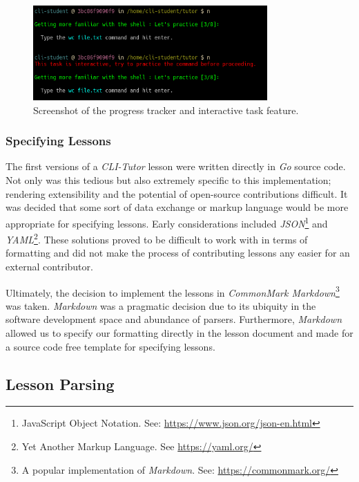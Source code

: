 \begin{figure}[htbp]
	\centering
	\includegraphics[width=0.8\textwidth]{img/tracker}
	\caption{Screenshot of the progress tracker and interactive task feature.}
	\label{fig:tracker}
\end{figure}
\clearpage

\subsubsection{Specifying Lessons}

The first versions of a \textit{CLI-Tutor} lesson were written directly in
\textit{Go} source code. Not only was this tedious but also extremely specific
to this implementation; rendering extensibility and the potential of open-source contributions
difficult. It was decided that some sort of data exchange or markup language
would be more appropriate for specifying lessons. Early considerations included
\textit{JSON}\footnote{JavaScript Object Notation. See:
\url{https://www.json.org/json-en.html}} and \textit{YAML}\footnote{Yet Another
Markup Language. See \url{https://yaml.org/}}. These solutions proved to be
difficult to work with in terms of formatting and did not make the process of
contributing lessons any easier for an external contributor.

Ultimately, the decision to implement the lessons in \textit{CommonMark
Markdown}\footnote{A popular implementation of \textit{Markdown}. See:
\url{https://commonmark.org/}} was taken. \textit{Markdown} was a pragmatic
decision due to its ubiquity in the software development space and abundance of
parsers. Furthermore, \textit{Markdown} allowed us to specify our formatting
directly in the lesson document and made for a source code free template for
specifying lessons.

\subsection{Lesson Parsing}
\label{sec:parser}

